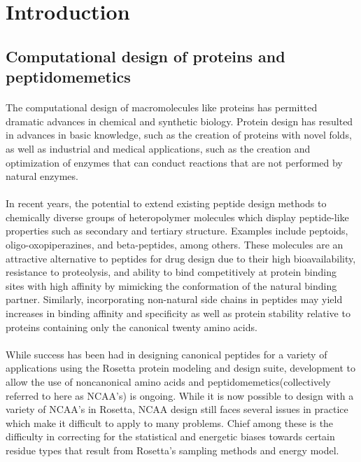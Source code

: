 \section{Introduction}
\subsection{Computational design of proteins and peptidomemetics}
\paragraph{}
The computational design of macromolecules like proteins has permitted dramatic advances in chemical and synthetic biology.
Protein design has resulted in advances in basic knowledge, such as the creation of proteins with novel folds\cite{kuhlman_design_2003}, as well as industrial and medical applications, such as the creation and optimization of enzymes that can conduct reactions that are not performed by natural enzymes\cite{jiang_denovo_2008,rothlisberger_kemp_2008}.

\paragraph{}
In recent years, the potential to extend existing peptide design methods to chemically diverse groups of heteropolymer molecules which display peptide-like properties such as secondary and tertiary structure.
Examples include peptoids\cite{renfrew_incorporation_2012}, oligo-oxopiperazines\cite{lao_rational_2014}, and beta-peptides\cite{molski_remodeling_2012}, among others.
These molecules are an attractive alternative to peptides for drug design due to their high bioavailability, resistance to proteolysis, and ability to bind competitively at protein binding sites with high affinity by mimicking the conformation of the natural binding partner\cite{lao_rational_2014}.
Similarly, incorporating non-natural side chains in peptides may yield increases in binding affinity and specificity as well as protein stability relative to proteins containing only the canonical twenty amino acids\cite{horng_values_2003}.

\paragraph{}
While success has been had in designing canonical peptides for a variety of applications using the Rosetta protein modeling and design suite\cite{leaver-fay_chapter_2011,jiang_denovo_2008,rothlisberger_kemp_2008}, development to allow the use of noncanonical amino acids and peptidomemetics(collectively referred to here as NCAA's) is ongoing.
While it is now possible to design with a variety of NCAA's in Rosetta\cite{renfrew_incorporation_2012,drew_adding_2013}, NCAA design still faces several issues in practice which make it difficult to apply to many problems.
Chief among these is the difficulty in correcting for the statistical and energetic biases towards certain residue types that result from Rosetta's sampling methods and energy model.

